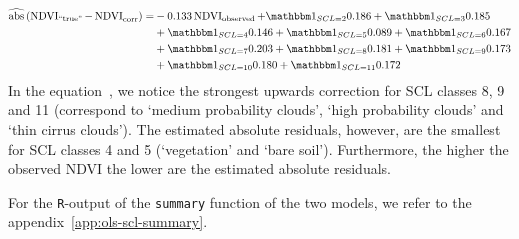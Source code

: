 	\begin{equation}\label{eq:corr_lm_res}
		\begin{aligned}		
			\widehat{\operatorname{abs}}\left({\operatorname{NDVI}_\text{``true''} - \operatorname{NDVI}}_{\text{corr}}\right)  = &
			-0.133 \operatorname{NDVI}_\text{observed}  
			+ \mathbbm 1_{{SCL = 2}} 0.186 
			+ \mathbbm 1_{{SCL = 3}} 0.185 \\ &
			+ \mathbbm 1_{{SCL = 4}} 0.146 
			+ \mathbbm 1_{{SCL = 5}} 0.089 
			+ \mathbbm 1_{{SCL = 6}} 0.167 \\ &
			+ \mathbbm 1_{{SCL = 7}} 0.203 
			+ \mathbbm 1_{{SCL = 8}} 0.181  
			+ \mathbbm 1_{{SCL = 9}} 0.173 \\ &
			+ \mathbbm 1_{{SCL = 10}} 0.180 
			+ \mathbbm 1_{{SCL = 11}} 0.172 
		\end{aligned}
	\end{equation} 
	In the equation~, we notice the strongest upwards correction for SCL classes 8, 9 and 11 (correspond to `medium probability clouds', `high probability clouds' and `thin cirrus clouds'). The estimated absolute residuals, however, are the smallest for SCL classes 4 and 5 (`vegetation' and `bare soil'). Furthermore, the higher the observed NDVI the lower are the estimated absolute residuals.

	For the \texttt{R}-output of the \texttt{summary} function of the two models, we refer to the appendix~\ref{app:ols-scl-summary}. 


	







